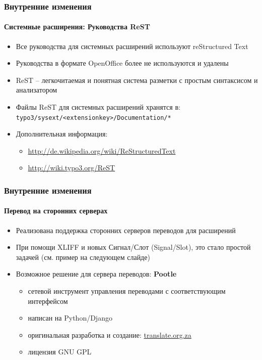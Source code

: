 \begin{frame}[fragile]
	\frametitle{Внутренние изменения}
	\framesubtitle{Системные расширения: Руководства ReST}

	\begin{itemize}
		\item Все руководства для системных расширений используют reStructured Text
		\item Руководства в формате OpenOffice более не используются и удалены
		\item ReST – легкочитаемая и понятная система разметки с простым синтаксисом и анализатором
		\item Файлы ReST для системных расширений хранятся в:\newline
			\texttt{typo3/sysext/<extensionkey>/Documentation/*}

		\item Дополнительная информация:

			\begin{itemize}
				\item \url{http://de.wikipedia.org/wiki/ReStructuredText}
				\item \url{http://wiki.typo3.org/ReST}
			\end{itemize}

	\end{itemize}

\end{frame}


\begin{frame}[fragile]
	\frametitle{Внутренние изменения}
	\framesubtitle{Перевод на сторонних серверах}

	\begin{itemize}
		\item Реализована поддержка сторонних серверов переводов для расширений
		\item При помощи XLIFF и новых Сигнал/Слот (Signal/Slot),\newline
			это стало простой задачей (см. пример на следующем слайде)
		\item Возможное решение для сервера переводов: \textbf{Pootle}

			\begin{itemize}
				\item сетевой инструмент управления переводами с соответствующим интерфейсом
				\item написан на Python/Django
				\item оригинальная разработка и создание: \url{translate.org.za}
				\item лицензия GNU GPL
			\end{itemize}

	\end{itemize}

\end{frame}

